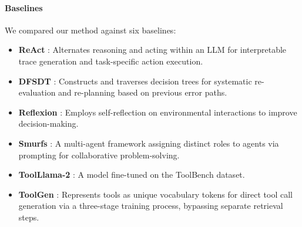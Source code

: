 \documentclass{article}
\begin{document}
\paragraph{Baselines}
We compared our method against six baselines:
\begin{itemize}
\item \textbf{ReAct} \cite{yao2022react}: Alternates reasoning and acting within an LLM for interpretable trace generation and task-specific action execution.
\item \textbf{DFSDT} \cite{qin2023toolllm}: Constructs and traverses decision trees for systematic re-evaluation and re-planning based on previous error paths.
\item \textbf{Reflexion} \cite{shinn2024reflexion}: Employs self-reflection on environmental interactions to improve decision-making.
\item \textbf{Smurfs} \cite{chen2024smurfs}: A multi-agent framework assigning distinct roles to agents via prompting for collaborative problem-solving.
\item \textbf{ToolLlama-2} \cite{qin2023toolllm}: A model fine-tuned on the ToolBench dataset.
\item \textbf{ToolGen} \cite{wang2024toolgen}: Represents tools as unique vocabulary tokens for direct tool call generation via a three-stage training process, bypassing separate retrieval steps.
\end{itemize}
\end{document}
